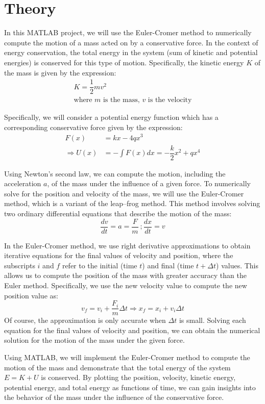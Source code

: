 \documentclass[13pt,a4paper]{report}
\begin{document}
\newpage
\section{Theory}
In this MATLAB project, we will use the Euler-Cromer method\cite{euler} to numerically compute the motion of a mass acted on by a conservative force. In the context of energy conservation, the total energy in the system (sum of kinetic and potential energies) is conserved for this type of motion. Specifically, the kinetic energy $K$ of the mass is given by the expression:
\begin{gather*}
K = \dfrac{1}{2}mv^2\\
\text{where } m \text{ is the mass, } v \text{ is the velocity}
\end{gather*}

Specifically, we will consider a potential energy function which has a corresponding conservative force given by the expression: $$
\begin{aligned}
F(x) &= kx - 4qx^3\\
\Rightarrow U(x) &= - \displaystyle \int F(x) dx = -\dfrac{k}{2}x^2 + qx^4
\end{aligned}
$$

Using Newton's second law, we can compute the motion, including the acceleration $a$, of the mass under the influence of a given force. To numerically solve for the position and velocity of the mass, we will use the Euler-Cromer method, which is a variant of the leap–frog method. This method involves solving two ordinary differential equations that describe the motion of the mass: $$\dfrac{dv}{dt} = a = \dfrac{F}{m}\ ; \dfrac{dx}{dt} = v$$

In the Euler-Cromer method, we use right derivative approximations to obtain iterative equations for the final values of velocity and position, where the subscripts $i$ and $f$ refer to the initial (time $t$) and final (time $t + \Delta t$) values. This allows us to compute the position of the mass with greater accuracy than the Euler method. Specifically, we use the new velocity value to compute the new position value as: $$v_f = v_i + \dfrac{F_i}{m}\Delta t \Rightarrow x_f = x_i + v_i \Delta t$$
Of course, the approximation is only accurate when $\Delta t$ is small. Solving each equation for the final values of velocity and position, we can obtain the numerical solution for the motion of the mass under the given force.

Using MATLAB, we will implement the Euler-Cromer method to compute the motion of the mass and demonstrate that the total energy of the system $E = K + U$ is conserved. By plotting the position, velocity, kinetic energy, potential energy, and total energy as functions of time, we can gain insights into the behavior of the mass under the influence of the conservative force.
\end{document}
